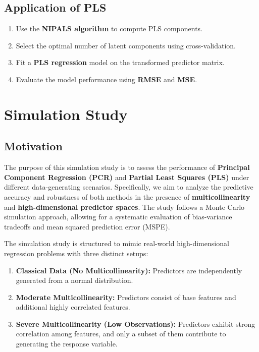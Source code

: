 \documentclass[11pt,twoside,a4paper]{article}
\begin{document}
\subsection{Application of PLS}
\begin{enumerate}
    \item Use the \textbf{NIPALS algorithm} to compute PLS components.
    \item Select the optimal number of latent components using cross-validation.
    \item Fit a \textbf{PLS regression} model on the transformed predictor matrix.
    \item Evaluate the model performance using \textbf{RMSE} and \textbf{MSE}.
\end{enumerate}

\section{Simulation Study}

\subsection{Motivation}
The purpose of this simulation study is to assess the performance of \textbf{Principal Component Regression (PCR)} and \textbf{Partial Least Squares (PLS)} under different data-generating scenarios. Specifically, we aim to analyze the predictive accuracy and robustness of both methods in the presence of \textbf{multicollinearity} and \textbf{high-dimensional predictor spaces}. The study follows a Monte Carlo simulation approach, allowing for a systematic evaluation of bias-variance tradeoffs and mean squared prediction error (MSPE).

The simulation study is structured to mimic real-world high-dimensional regression problems with three distinct setups:
\begin{enumerate}
    \item \textbf{Classical Data (No Multicollinearity):} Predictors are independently generated from a normal distribution.
    \item \textbf{Moderate Multicollinearity:} Predictors consist of base features and additional highly correlated features.
    \item \textbf{Severe Multicollinearity (Low Observations):} Predictors exhibit strong correlation among features, and only a subset of them contribute to generating the response variable.
\end{enumerate}
\end{document}
